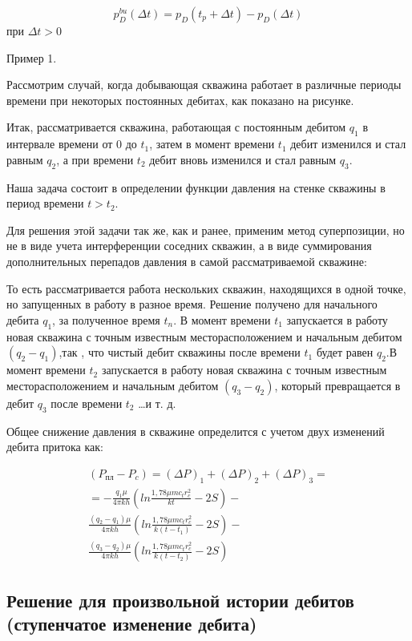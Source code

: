 $$ p_{D}^{bu}(\Delta t)=p_D(t_p +\Delta t) - p_D(\Delta t)$$  при $\Delta t > 0$

Пример 1.

Рассмотрим случай, когда добывающая скважина работает в различные периоды времени при некоторых постоянных дебитах, как показано на рисунке.  



Итак, рассматривается скважина, работающая с постоянным дебитом $q_1$ в интервале времени от 0 до $t_1$, затем в момент времени $t_1$ дебит изменился и стал равным $q_2$, а при времени $t_2$ дебит вновь изменился и стал равным $q_3$.

Наша задача состоит в определении функции давления на стенке скважины в период времени $t>t_2$.

Для решения этой задачи так же, как и ранее, применим метод суперпозиции, но не в виде учета интерференции соседних скважин, а в виде суммирования дополнительных перепадов давления в самой рассматриваемой скважине:

То есть рассматривается работа нескольких скважин, находящихся в одной точке, но запущенных в работу в разное время. Решение получено для начального дебита $q_1$, за полученное время $t_n$. В момент времени $t_1$ запускается в работу новая скважина с точным известным месторасположением и начальным дебитом $ \left(q_2 - q_1\right)$,так , что чистый дебит скважины после времени  $t_1$ будет равен  $q_2$.В момент времени $t_2$ запускается в работу новая скважина с точным известным месторасположением и начальным дебитом $ \left(q_3 - q_2\right)$, который превращается в дебит $q_3$ после времени $t_2$ …и т. д.

Общее снижение давления в скважине определится с учетом двух изменений дебита притока как:

\begin{eqnarray}
	\left( P_{пл} - P_c\right) = \left( \Delta P\right)_1 + \left( \Delta P\right)_2 +\left( \Delta P\right)_3 = \nonumber  \\ 
	= - \frac{q_1 \mu}{4\pi kh} \left( ln \frac{1,78 \mu m c_t r_c^2}{kt}-2S \right) - \nonumber  \\ 
	\frac{ \left(q_2 - q_1\right)\mu}{4\pi kh} \left( ln \frac{1,78 \mu m c_t r_c^2}{k\left(t-t_1\right)}-2S \right)- \nonumber  \\ 
	\frac{ \left(q_3 - q_2\right)\mu}{4\pi kh} \left( ln \frac{1,78 \mu m c_t r_c^2}{k\left(t-t_2\right)}-2S \right)
\end{eqnarray}

\subsection{Решение для произвольной истории дебитов (ступенчатое изменение дебита)} 

